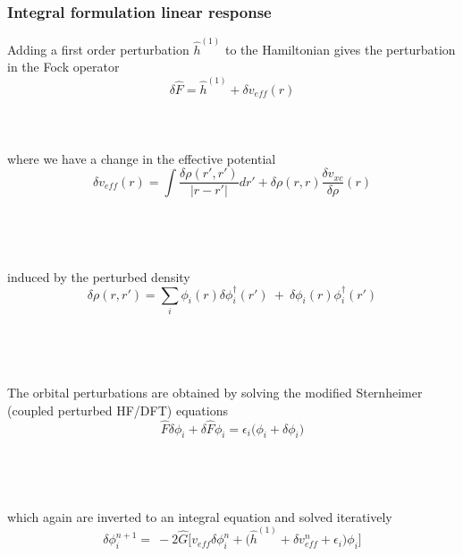 \begin{frame}
    \frametitle{Integral formulation linear response}
    \centering
    Adding a first order perturbation $\hat{h}^{(1)}$ to the Hamiltonian
    gives the perturbation in the Fock operator
    \begin{equation}
	\nonumber
	\delta\hat{F} = \hat{h}^{(1)} + \delta v_{eff}(r)
    \end{equation}
    \ \\
    \ \\
    \ \\
    where we have a change in the effective potential
    \begin{equation}
	\nonumber
	\delta v_{eff}(r) = \int \frac{\delta \rho(r', r')}{|r-r'|}dr'
	+ \delta \rho(r,r) \frac{\delta v_{xc}}{\delta\rho}(r)
    \end{equation}
    \ \\
    \ \\
    \ \\
    \ \\
    induced by the perturbed density
    \begin{equation}
	\nonumber
	\delta \rho(r,r') =
	\sum_i \phi_i(r)\delta\phi_i^\dag(r')\ +\ 
	\delta\phi_i(r)\phi_i^\dag(r')
    \end{equation}
    \ \\
    \ \\
    \ \\
    \ \\
    The orbital perturbations are obtained by solving the modified Sternheimer 
    (coupled perturbed HF/DFT) equations
    \begin{equation}
	\nonumber
	\hat{F}\delta\phi_i + \delta\hat{F}\phi_i = 
	\epsilon_i \Big(\phi_i + \delta\phi_i\Big)
    \end{equation}
    \ \\
    \ \\
    \ \\
    \ \\
    which again are inverted to an integral equation and solved iteratively
    \begin{equation}
	\nonumber
	\delta\phi_i^{n+1} =\ 
	-2\hat{G}\Big[v_{eff} \delta\phi_i^n + \Big(\hat{h}^{(1)} + 
        \delta v_{eff}^n + \epsilon_i\Big)\phi_i\Big]
    \end{equation}
\end{frame}


